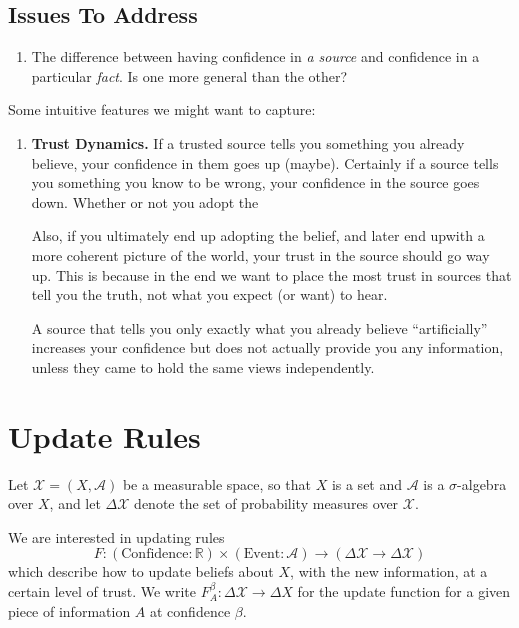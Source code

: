 \documentclass{article}
\begin{document}
\subsection*{Issues To Address}
\begin{enumerate}
    \item The difference between having confidence in \emph{a source} and confidence in a particular \emph{fact}.  Is one more general than the other?
\end{enumerate}

Some intuitive features we might want to capture:
\begin{enumerate}

    \item \textbf{Trust Dynamics.} If a trusted source tells you something you already believe, your confidence in them goes up (maybe). Certainly if a source tells you something you know to be wrong, your confidence in the source goes down.  Whether or not you adopt the

    Also, if you ultimately end up adopting the belief, and later end upwith a more coherent picture of the world, your trust in the source should go way up.
    This is because in the end we want to place the most trust in sources that tell you the truth, not what you expect (or want) to hear.

    A source that tells you only exactly what you already believe ``artificially'' increases your confidence but does not actually provide you any information, unless they came to hold the same views independently.

\end{enumerate}

\TODO
\clearpage

\section{Update Rules}
\def\X{\mathcal X}
Let $\X = (X, \mathcal A)$ be a measurable space, so that $X$ is a set and $\mathcal A$ is a $\sigma$-algebra over $X$, and let $\Delta \X$ denote the set of probability measures over $\X$. 

We are interested in updating rules
\[
    F: (\text{Confidence} : \mathbb R) \times (\text{Event} : \mathcal A) \to (\Delta\X  \to \Delta \X)
\]
which describe how to update beliefs about $X$, with the new information, at a certain level of trust. We write $F^\beta_A : \Delta\X \to \Delta X$ for the update function for a given piece of information $A$ at confidence $\beta$.
\end{document}
